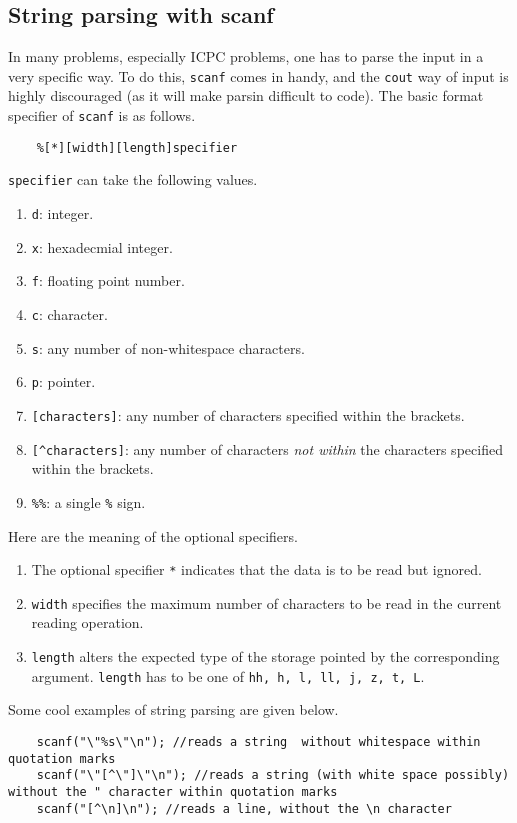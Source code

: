 \documentclass[12pt,a4paper]{amsart}
\numberwithin{equation}{section}
\theoremstyle{definition}
\begin{document}
\subsection{String parsing with scanf} In many problems, especially ICPC problems, one has to parse the input in a very specific way. To do this, \verb|scanf| comes in handy, and the \verb|cout| way of input is highly discouraged (as it will make parsin difficult to code). The basic format specifier of \verb|scanf| is as follows. 
\begin{verbatim}
    %[*][width][length]specifier
\end{verbatim}
\verb|specifier| can take the following values. 
\begin{enumerate}
    \item \verb|d|: integer.
    \item \verb|x|: hexadecmial integer.
    \item \verb|f|: floating point number.
    \item \verb|c|: character.
    \item \verb|s|: any number of non-whitespace characters.
    \item \verb|p|: pointer.
    \item \verb|[characters]|: any number of characters specified within the brackets.
    \item \verb|[^characters]|: any number of characters \textit{not within} the characters specified within the brackets.
    \item \verb|%%|: a single \verb|%| sign. 
\end{enumerate}
Here are the meaning of the optional specifiers. 
\begin{enumerate}
    \item The optional specifier \verb|*| indicates that the data is to be read but ignored.
    \item \verb|width| specifies the maximum number of characters to be read in the current reading operation.
    \item \verb|length| alters the expected type of the storage pointed by the corresponding argument. \verb|length| has to be one of \verb|hh, h, l, ll, j, z, t, L|. 
\end{enumerate}
Some cool examples of string parsing are given below. 
\begin{lstlisting}
    scanf("\"%s\"\n"); //reads a string  without whitespace within quotation marks
    scanf("\"[^\"]\"\n"); //reads a string (with white space possibly) without the " character within quotation marks
    scanf("[^\n]\n"); //reads a line, without the \n character
\end{lstlisting}
\end{document}
